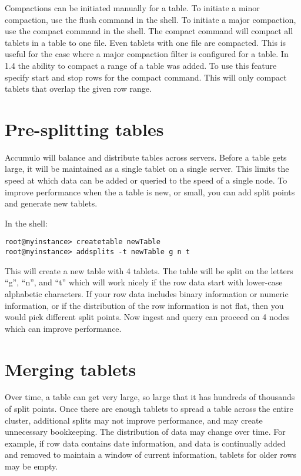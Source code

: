 Compactions can be initiated manually for a table. To initiate a minor
compaction, use the flush command in the shell. To initiate a major compaction,
use the compact command in the shell. The compact command will compact all
tablets in a table to one file. Even tablets with one file are compacted. This
is useful for the case where a major compaction filter is configured for a
table. In 1.4 the ability to compact a range of a table was added. To use this
feature specify start and stop rows for the compact command. This will only
compact tablets that overlap the given row range.

\section{Pre-splitting tables}

Accumulo will balance and distribute tables across servers. Before a
table gets large, it will be maintained as a single tablet on a single
server. This limits the speed at which data can be added or queried
to the speed of a single node. To improve performance when the a table
is new, or small, you can add split points and generate new tablets.

In the shell:

\begingroup\fontsize{8pt}{8pt}\selectfont\begin{verbatim}
root@myinstance> createtable newTable
root@myinstance> addsplits -t newTable g n t
\end{verbatim}\endgroup

This will create a new table with 4 tablets. The table will be split
on the letters ``g'', ``n'', and ``t'' which will work nicely if the
row data start with lower-case alphabetic characters. If your row
data includes binary information or numeric information, or if the
distribution of the row information is not flat, then you would pick
different split points. Now ingest and query can proceed on 4 nodes
which can improve performance.

\section{Merging tablets}

Over time, a table can get very large, so large that it has hundreds
of thousands of split points. Once there are enough tablets to spread
a table across the entire cluster, additional splits may not improve
performance, and may create unnecessary bookkeeping. The distribution
of data may change over time. For example, if row data contains date
information, and data is continually added and removed to maintain a
window of current information, tablets for older rows may be empty.

